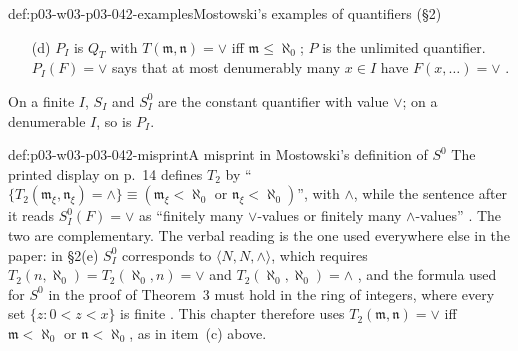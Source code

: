 \begin{hbexample}{def:p03-w03-p03-042-examples}{Mostowski's examples of quantifiers (\S2)}
\begin{enumerate}
      says that at most finitely many \(x\) have \(F(x,\ldots)=\vee\) or at
      most finitely many have \(F(x,\ldots)=\wedge\)
      \cite[p.~14]{Mostowski1957}.  For the printed form of \(T_2\) see
      \cref{def:p03-w03-p03-042-misprint}.
\item[(d)] \(P_I\) is \(Q_T\) with \(T(\mathfrak m,\mathfrak n)=\vee\) iff
      \(\mathfrak m\le\aleph_0\); \(P\) is the unlimited quantifier.
      \(P_I(F)=\vee\) says that at most denumerably many \(x\in I\) have
      \(F(x,\ldots)=\vee\) \cite[pp.~14--15]{Mostowski1957}.
\end{enumerate}
On a finite \(I\), \(S_I\) and \(S^0_I\) are the constant quantifier with
value \(\vee\); on a denumerable \(I\), so is \(P_I\).
\end{hbexample}

\begin{hbwarning}{def:p03-w03-p03-042-misprint}{A misprint in Mostowski's definition of \(S^0\)}
The printed display on p.~14 defines \(T_2\) by
``\(\{T_2(\mathfrak m_\xi,\mathfrak n_\xi)=\wedge\}\equiv(\mathfrak m_\xi<
\aleph_0\text{ or }\mathfrak n_\xi<\aleph_0)\)'', with \(\wedge\), while the
sentence after it reads \(S^0_I(F)=\vee\) as ``finitely many \(\vee\)-values
or finitely many \(\wedge\)-values'' \cite[p.~14]{Mostowski1957}.  The two
are complementary.  The verbal reading is the one used everywhere else in
the paper: in \S2(e) \(S^0_I\) corresponds to \(\langle N,N,\wedge\rangle\),
which requires \(T_2(n,\aleph_0)=T_2(\aleph_0,n)=\vee\) and
\(T_2(\aleph_0,\aleph_0)=\wedge\) \cite[p.~15]{Mostowski1957}, and the
formula used for \(S^0\) in the proof of Theorem~3 must hold in the ring of
integers, where every set \(\{z:0<z<x\}\) is finite
\cite[p.~19]{Mostowski1957}.  This chapter therefore uses
\(T_2(\mathfrak m,\mathfrak n)=\vee\) iff \(\mathfrak m<\aleph_0\) or
\(\mathfrak n<\aleph_0\), as in item~(c) above.
\end{hbwarning}

